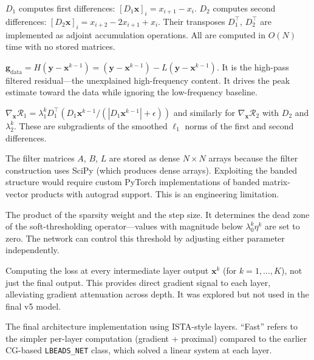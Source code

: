 \documentclass[11pt, letterpaper]{article}
\begin{document}
{$D_1$ computes first differences: $[D_1\mathbf{x}]_i = x_{i+1} - x_i$.  $D_2$ computes second differences: $[D_2\mathbf{x}]_i = x_{i+2} - 2x_{i+1} + x_i$.  Their transposes $D_1^\top$, $D_2^\top$ are implemented as adjoint accumulation operations.  All are computed in $O(N)$ time with no stored matrices.}

{$\mathbf{g}_{\text{data}} = H(\mathbf{y} - \mathbf{x}^{k-1}) = (\mathbf{y} - \mathbf{x}^{k-1}) - L(\mathbf{y} - \mathbf{x}^{k-1})$.  It is the high-pass filtered residual---the unexplained high-frequency content.  It drives the peak estimate toward the data while ignoring the low-frequency baseline.}

{$\nabla_\mathbf{x}\mathcal{R}_1 = \lambda_1^k D_1^\top(D_1\mathbf{x}^{k-1}/(|D_1\mathbf{x}^{k-1}| + \epsilon))$ and similarly for $\nabla_\mathbf{x}\mathcal{R}_2$ with $D_2$ and $\lambda_2^k$.  These are subgradients of the smoothed $\ell_1$ norms of the first and second differences.}

{The filter matrices $A$, $B$, $L$ are stored as dense $N \times N$ arrays because the filter construction uses SciPy (which produces dense arrays).  Exploiting the banded structure would require custom PyTorch implementations of banded matrix-vector products with autograd support.  This is an engineering limitation.}

{The product of the sparsity weight and the step size.  It determines the dead zone of the soft-thresholding operator---values with magnitude below $\lambda_0^k\eta^k$ are set to zero.  The network can control this threshold by adjusting either parameter independently.}

{Computing the loss at every intermediate layer output $\mathbf{x}^k$ (for $k = 1, \ldots, K$), not just the final output.  This provides direct gradient signal to each layer, alleviating gradient attenuation across depth.  It was explored but not used in the final v5 model.}

{The final architecture implementation using ISTA-style layers.  ``Fast'' refers to the simpler per-layer computation (gradient + proximal) compared to the earlier CG-based \texttt{LBEADS\_NET} class, which solved a linear system at each layer.}
\end{document}

